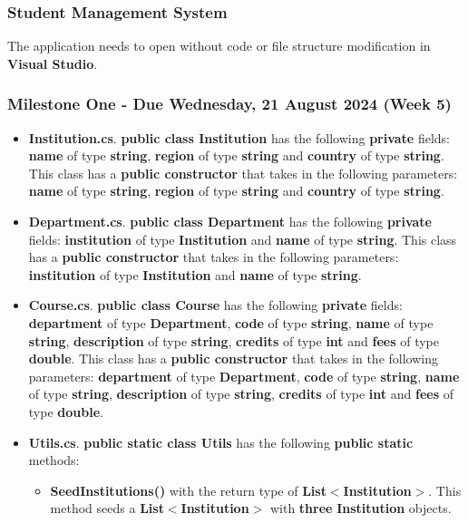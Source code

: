 \documentclass{article}
\begin{document}
\subsubsection*{Student Management System}

The application needs to open without code or file structure modification in \textbf{Visual Studio}.

\subsubsection*{Milestone One - Due Wednesday, 21 August 2024 (Week 5)}

\begin{itemize}
    \item \textbf{Institution.cs}. \textbf{public class Institution} has the following \textbf{private} fields: \textbf{name} of type \textbf{string}, \textbf{region} of type \textbf{string} and \textbf{country} of type \textbf{string}. This class has a \textbf{public constructor} that takes in the following parameters: \textbf{name} of type \textbf{string}, \textbf{region} of type \textbf{string} and \textbf{country} of type \textbf{string}. 
    \item \textbf{Department.cs}. \textbf{public class Department} has the following \textbf{private} fields: \textbf{institution} of type \textbf{Institution} and \textbf{name} of type \textbf{string}. This class has a \textbf{public constructor} that takes in the following parameters: \textbf{institution} of type \textbf{Institution} and \textbf{name} of type \textbf{string}.
    \item \textbf{Course.cs}. \textbf{public class Course} has the following \textbf{private} fields: \textbf{department} of type \textbf{Department}, \textbf{code} of type \textbf{string}, \textbf{name} of type \textbf{string}, \textbf{description} of type \textbf{string}, \textbf{credits} of type \textbf{int} and \textbf{fees} of type \textbf{double}. This class has a \textbf{public constructor} that takes in the following parameters: \textbf{department} of type \textbf{Department}, \textbf{code} of type \textbf{string}, \textbf{name} of type \textbf{string}, \textbf{description} of type \textbf{string}, \textbf{credits} of type \textbf{int} and \textbf{fees} of type \textbf{double}.
    \item \textbf{Utils.cs}. \textbf{public static class Utils} has the following \textbf{public static} methods:
    \begin{itemize}
        \item \textbf{SeedInstitutions()} with the return type of \textbf{List$<$Institution$>$}. This method seeds a \textbf{List$<$Institution$>$} with \textbf{three} \textbf{Institution} objects.

\end{itemize}
\end{itemize}
\end{document}
